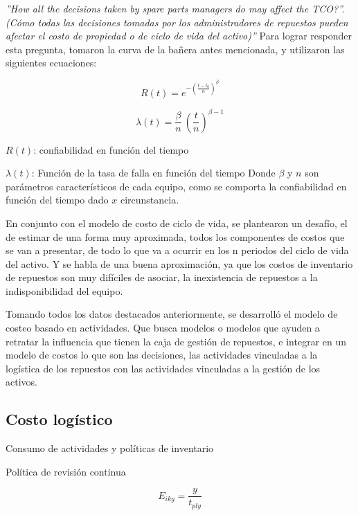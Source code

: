 \documentclass[]{article}
\begin{document}
\textsl{''How all the decisions taken by spare parts managers do may affect the TCO?”. (Cómo todas las decisiones tomadas por los administradores de repuestos pueden afectar el costo de propiedad o de ciclo de vida del activo)''}
Para lograr responder esta pregunta, tomaron la curva de la bañera antes mencionada, y utilizaron las siguientes ecuaciones:

\begin{equation}
    R(t) = e^{{-(\frac{t-t_0}{n})}^{\beta}}
\end{equation}

\begin{equation}
    \lambda(t) = \frac{\beta}{n} \ \! (\frac{t}{n})^{\beta - 1} 
\end{equation}

$R(t)$: confiabilidad en función del tiempo

$\lambda(t)$: Función de la tasa de falla en función del tiempo
Donde $\beta$ y $n$ son parámetros característicos de cada equipo, como se comporta la confiabilidad en función del tiempo dado $x$ circunstancia.

En conjunto con el modelo de costo de ciclo de vida, se plantearon un desafío, el de estimar de una forma muy aproximada, todos los componentes de costos que se van a presentar, de todo lo que va a ocurrir en los n periodos del ciclo de vida del activo. Y se habla de una buena aproximación, ya que los costos de inventario de repuestos son muy difíciles de asociar, la inexistencia de repuestos a la indisponibilidad del equipo. 

Tomando todos los datos destacados anteriormente, se desarrolló el modelo de costeo basado en actividades. Que busca modelos o modelos que ayuden a retratar la influencia que tienen la caja de gestión de repuestos, e integrar en un modelo de costos lo que son las decisiones, las actividades vinculadas a la logística de los repuestos con las actividades vinculadas a la gestión de los activos. 

\subsection{Costo logístico }


Consumo de actividades y políticas de inventario


Política de revisión continua 


\begin{equation}
    E_{iky} = \frac{y}{t_{ply}}
\end{equation}
\end{document}
